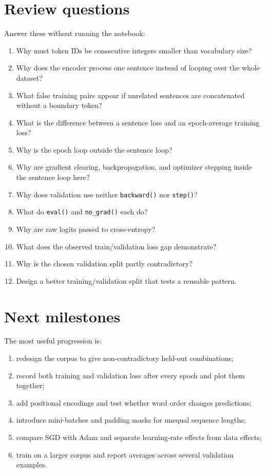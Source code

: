 \documentclass[11pt]{article}
\begin{document}
\section{Review questions}

Answer these without running the notebook:
\begin{enumerate}
\item Why must token IDs be consecutive integers smaller than vocabulary size?
\item Why does the encoder process one sentence instead of looping over the whole dataset?
\item What false training pairs appear if unrelated sentences are concatenated without a boundary token?
\item What is the difference between a sentence loss and an epoch-average training loss?
\item Why is the epoch loop outside the sentence loop?
\item Why are gradient clearing, backpropagation, and optimizer stepping inside the sentence loop here?
\item Why does validation use neither \texttt{backward()} nor \texttt{step()}?
\item What do \texttt{eval()} and \texttt{no\_grad()} each do?
\item Why are raw logits passed to cross-entropy?
\item What does the observed train/validation loss gap demonstrate?
\item Why is the chosen validation split partly contradictory?
\item Design a better training/validation split that tests a reusable pattern.
\end{enumerate}

\section{Next milestones}

The most useful progression is:
\begin{enumerate}
\item redesign the corpus to give non-contradictory held-out combinations;
\item record both training and validation loss after every epoch and plot them together;
\item add positional encodings and test whether word order changes predictions;
\item introduce mini-batches and padding masks for unequal sequence lengths;
\item compare SGD with Adam and separate learning-rate effects from data effects;
\item train on a larger corpus and report averages across several validation examples.
\end{enumerate}
\end{document}

